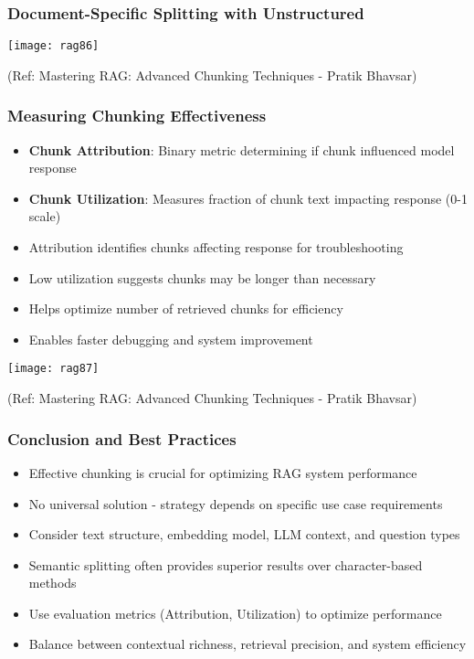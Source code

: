 \begin{frame}[fragile]\frametitle{Document-Specific Splitting with Unstructured}

  
  	\begin{center}

	\texttt{[image: rag86]}
	
	{\tiny (Ref: Mastering RAG: Advanced Chunking Techniques - Pratik Bhavsar)}
	
	\end{center}
\end{frame}
\begin{frame}[fragile]\frametitle{Measuring Chunking Effectiveness}
      \begin{itemize}
\item \textbf{Chunk Attribution}: Binary metric determining if chunk influenced model response
\item \textbf{Chunk Utilization}: Measures fraction of chunk text impacting response (0-1 scale)
\item Attribution identifies chunks affecting response for troubleshooting
\item Low utilization suggests chunks may be longer than necessary
\item Helps optimize number of retrieved chunks for efficiency
\item Enables faster debugging and system improvement
  \end{itemize}
  
  	\begin{center}

	\texttt{[image: rag87]}
	
	{\tiny (Ref: Mastering RAG: Advanced Chunking Techniques - Pratik Bhavsar)}
	
	\end{center}  
\end{frame}

\begin{frame}[fragile]\frametitle{Conclusion and Best Practices}
      \begin{itemize}
\item Effective chunking is crucial for optimizing RAG system performance
\item No universal solution - strategy depends on specific use case requirements
\item Consider text structure, embedding model, LLM context, and question types
\item Semantic splitting often provides superior results over character-based methods
\item Use evaluation metrics (Attribution, Utilization) to optimize performance
\item Balance between contextual richness, retrieval precision, and system efficiency
  \end{itemize}
\end{frame}